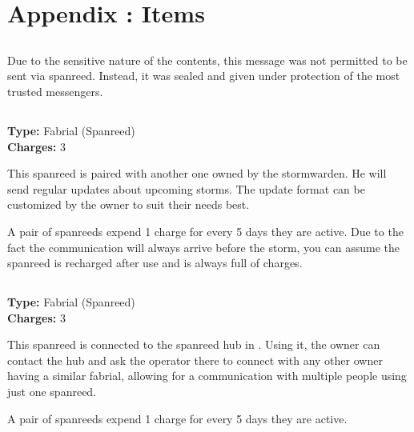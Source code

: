 \chapter{Appendix \thechapter{}: Items}
\label{chap:items}

\section{\lootSealedMessage{}}

Due to the sensitive nature of the contents, this message was not permitted to be sent via spanreed. Instead, it was sealed and given under protection of the most trusted messengers.




\section{\lootSpanreedStormwarden{}}

\textbf{Type:} Fabrial (Spanreed) \\
\textbf{Charges:} 3

This spanreed is paired with another one owned by \npcStormwarden{} the stormwarden. He will send regular updates about upcoming storms. The update format can be customized by the owner to suit their needs best.

A pair of spanreeds expend 1 charge for every 5 days they are active. Due to the fact the communication will always arrive before the storm, you can assume the spanreed is recharged after use and is always full of charges.



\section{\lootSpanreedTashikk{}}

\textbf{Type:} Fabrial (Spanreed) \\
\textbf{Charges:} 3

This spanreed is connected to the spanreed hub in \locationTashikk{}. Using it, the owner can contact the hub and ask the operator there to connect with any other owner having a similar fabrial, allowing for a communication with multiple people using just one spanreed.

A pair of spanreeds expend 1 charge for every 5 days they are active.